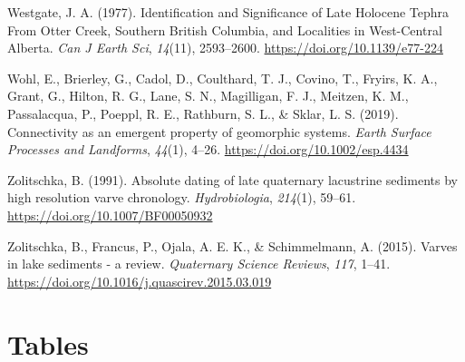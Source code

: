 \documentclass[
  letterpaper,
  DIV=11,
  numbers=noendperiod]{scrartcl}
\newlength{\cslhangindent}
\newlength{\cslentryspacingunit} %
\newenvironment{CSLReferences}[2] %
 {%
  \setlength{\parindent}{0pt}
  \ifodd #1
  \let\oldpar\par
  \def\par{\hangindent=\cslhangindent\oldpar}
  \fi
  \setlength{\parskip}{#2\cslentryspacingunit}
 }%
 {}
\begin{document}
\begin{CSLReferences}{1}{0}
\leavevmode{}%
Westgate, J. A. (1977). {Identification and Significance of Late
Holocene Tephra From Otter Creek, Southern British Columbia, and
Localities in West-Central Alberta.} \emph{Can J Earth Sci},
\emph{14}(11), 2593--2600. \url{https://doi.org/10.1139/e77-224}

\leavevmode{}%
Wohl, E., Brierley, G., Cadol, D., Coulthard, T. J., Covino, T., Fryirs,
K. A., Grant, G., Hilton, R. G., Lane, S. N., Magilligan, F. J.,
Meitzen, K. M., Passalacqua, P., Poeppl, R. E., Rathburn, S. L., \&
Sklar, L. S. (2019). {Connectivity as an emergent property of geomorphic
systems}. \emph{Earth Surface Processes and Landforms}, \emph{44}(1),
4--26. \url{https://doi.org/10.1002/esp.4434}

\leavevmode{}%
Zolitschka, B. (1991). {Absolute dating of late quaternary lacustrine
sediments by high resolution varve chronology}. \emph{Hydrobiologia},
\emph{214}(1), 59--61. \url{https://doi.org/10.1007/BF00050932}

\leavevmode{}%
Zolitschka, B., Francus, P., Ojala, A. E. K., \& Schimmelmann, A.
(2015). {Varves in lake sediments - a review}. \emph{Quaternary Science
Reviews}, \emph{117}, 1--41.
\url{https://doi.org/10.1016/j.quascirev.2015.03.019}

\end{CSLReferences}

\pagebreak

\hypertarget{tables}{%
\section{Tables}\label{tables}}
\end{document}
